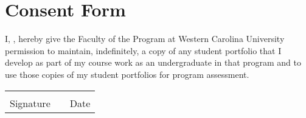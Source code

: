 \chapter*{Consent Form}\label{consentForm}
I, {\theAuthor}, hereby give the Faculty of the {\theMajor} Program at Western
Carolina University permission to maintain, indefinitely, a copy of any student
portfolio that I develop as part of my course work as an undergraduate in that
program and to use those copies of my student portfolios for program assessment.
\vspace{2cm}

\noindent \begin{tabular}{p{3in}p{1in}p{2in}}
\underline{\hspace{3in}} & & \underline{\hspace{2in}}\\
Signature                & & Date
\end{tabular}
